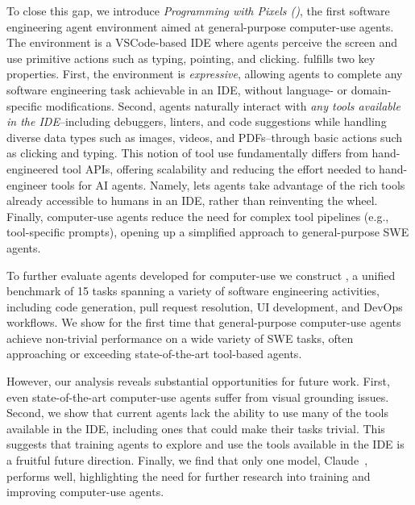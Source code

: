 To close this gap, we introduce \textit{Programming with Pixels (\ours{})}, the first software engineering agent environment aimed at general-purpose computer-use agents. 
The \ours{} environment is a VSCode-based IDE where 
agents perceive the screen and use primitive actions such as typing, pointing, and clicking.
\ours{} fulfills two key properties.
First, the environment is \textit{expressive}, allowing agents to complete any software engineering task achievable in an IDE, without language- or domain-specific modifications. 
Second, agents naturally interact with \textit{any tools available in the IDE}--including debuggers, linters, and code suggestions while handling diverse data types such as images, videos, and PDFs--through basic actions such as clicking and typing.
This notion of tool use fundamentally differs from hand-engineered tool APIs, offering scalability and reducing the effort needed to hand-engineer tools for AI agents.
Namely, \ours{} lets agents take advantage of the rich tools already accessible to humans in an IDE, rather than reinventing the wheel.
Finally, computer-use agents reduce the need for complex tool pipelines (e.g., tool-specific prompts), opening up a simplified approach to general-purpose SWE agents.


To further evaluate agents developed for computer-use we construct \bench{}, a unified benchmark of 15 tasks spanning a variety of software engineering activities, including code generation, pull request resolution, UI development, and DevOps workflows.
We show for the first time that general-purpose computer-use agents achieve non-trivial performance on a wide variety of SWE tasks, often approaching or exceeding state-of-the-art tool-based agents.


However, our analysis reveals substantial opportunities for future work. 
First, even state-of-the-art computer-use agents suffer from visual grounding issues. 
Second, we show that current agents lack the ability to use many of the tools available in the IDE, including ones that could make their tasks trivial. 
This suggests that training agents to explore and use the tools available in the IDE is a fruitful future direction.
Finally, we find that only one model, Claude~\citep{anthropic2024developing}, performs well, highlighting the need for further research into training and improving computer-use agents.

